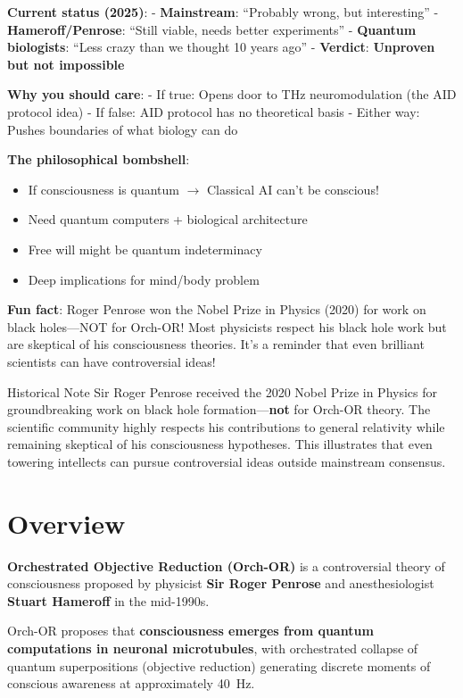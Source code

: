 \begin{nontechnical}
\textbf{Current status (2025)}: - \textbf{Mainstream}: ``Probably wrong,
but interesting'' - \textbf{Hameroff/Penrose}: ``Still viable, needs
better experiments'' - \textbf{Quantum biologists}: ``Less crazy than we
thought 10 years ago'' - \textbf{Verdict}: \textbf{Unproven but not
impossible}

\textbf{Why you should care}: - If true: Opens door to THz
neuromodulation (the AID protocol idea) - If false: AID protocol has no
theoretical basis - Either way: Pushes boundaries of what biology can do

\textbf{The philosophical bombshell}:
\begin{itemize}
\item If consciousness is quantum $\rightarrow$ Classical AI can't be conscious!
\item Need quantum computers + biological architecture
\item Free will might be quantum indeterminacy
\item Deep implications for mind/body problem
\end{itemize}

\textbf{Fun fact}: Roger Penrose won the Nobel Prize in Physics (2020) for work on black holes---NOT for Orch-OR! Most physicists respect his black hole work but are skeptical of his consciousness theories. It's a reminder that even brilliant scientists can have controversial ideas!
\end{nontechnical}

\begin{calloutbox}{Historical Note}
Sir Roger Penrose received the 2020 Nobel Prize in Physics for groundbreaking work on black hole formation---\textbf{not} for Orch-OR theory. The scientific community highly respects his contributions to general relativity while remaining skeptical of his consciousness hypotheses. This illustrates that even towering intellects can pursue controversial ideas outside mainstream consensus.
\end{calloutbox}

\section{Overview}

\textbf{Orchestrated Objective Reduction (Orch-OR)} is a controversial theory of consciousness proposed by physicist \textbf{Sir Roger Penrose} and anesthesiologist \textbf{Stuart Hameroff} in the mid-1990s.

\begin{keyconcept}
Orch-OR proposes that \textbf{consciousness emerges from quantum computations in neuronal microtubules}, with orchestrated collapse of quantum superpositions (objective reduction) generating discrete moments of conscious awareness at approximately 40~Hz.
\end{keyconcept}

